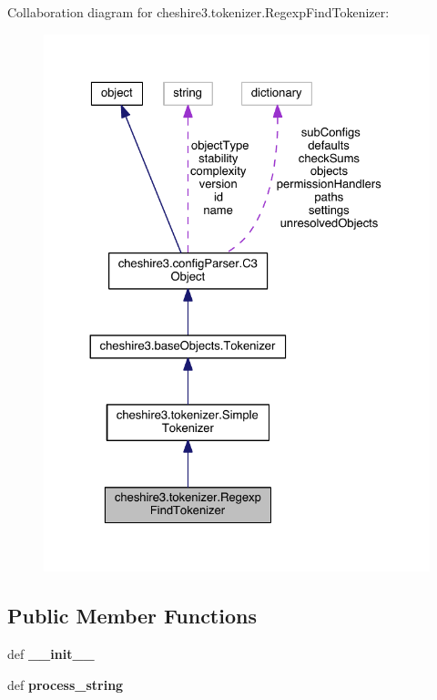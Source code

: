 Collaboration diagram for cheshire3.\-tokenizer.\-Regexp\-Find\-Tokenizer\-:
\nopagebreak
\begin{figure}[H]
\begin{center}
\leavevmode
\includegraphics[width=326pt]{classcheshire3_1_1tokenizer_1_1_regexp_find_tokenizer__coll__graph}
\end{center}
\end{figure}
\subsection*{Public Member Functions}
\begin{DoxyCompactItemize}
\item 
\hypertarget{classcheshire3_1_1tokenizer_1_1_regexp_find_tokenizer_aa3e5a8e7471bae02f786e23117295625}{def {\bfseries \-\_\-\-\_\-init\-\_\-\-\_\-}}\label{classcheshire3_1_1tokenizer_1_1_regexp_find_tokenizer_aa3e5a8e7471bae02f786e23117295625}

\item 
\hypertarget{classcheshire3_1_1tokenizer_1_1_regexp_find_tokenizer_a72e943b46f8425def88ec49e320468cd}{def {\bfseries process\-\_\-string}}\label{classcheshire3_1_1tokenizer_1_1_regexp_find_tokenizer_a72e943b46f8425def88ec49e320468cd}

\end{DoxyCompactItemize}
